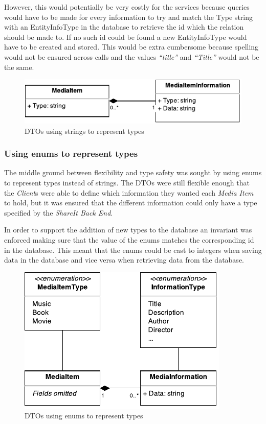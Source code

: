 \documentclass[../report.tex]{subfiles}
\begin{document}
However, this would potentially be very costly for the services because queries would have to be made for every information to try and match the Type string with an EntityInfoType in the database to retrieve the id which the relation should be made to. If no such id could be found a new EntityInfoType would have to be created and stored. This would be extra cumbersome because spelling would not be ensured across calls and the values \textit{``title''} and \textit{``Title''} would not be the same.
 
\begin{figure}[!h]
\label{fig:dto_types_string}
\centering
\includegraphics[scale=0.7]{../img/typesAsString.pdf}
\caption{DTOs using strings to represent types}
\end{figure}

\subsubsection{Using enums to represent types}
The middle ground between flexibility and type safety was sought by using enums to represent types instead of strings.
The DTOs were still flexible enough that the \textit{Client}s were able to define which information they wanted each \textit{Media Item} to hold, but it was ensured that the different information could only have a type specified by the \textit{ShareIt Back End}.

In order to support the addition of new types to the database an invariant was enforced making sure that the value of the enums matches the corresponding id in the database. 
This meant that the enums could be cast to integers when saving data in the database and vice versa when retrieving data from the database. 

\begin{figure}[!h]
\label{fig:dto_types_enum}
\centering
\includegraphics[scale=0.7]{../img/typesAsEnum.pdf}
\caption{DTOs using enums to represent types}
\end{figure}
\end{document}

